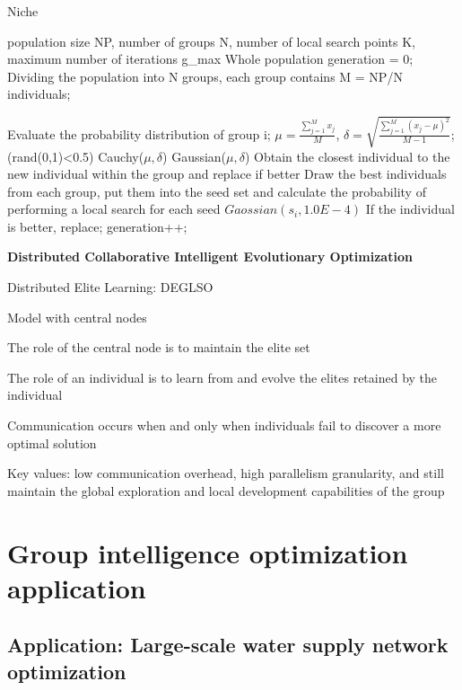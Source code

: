 \documentclass[twocolumn]{article}
\begin{document}
\begin{algorithm}[H]
	\caption{Niche}
	\label{alg:Framwork}
	\begin{algorithmic}[1]
		\Require
		population size NP, number of groups N, number of local search points K, maximum number of iterations g\_max
		\Ensure
		Whole population
		\State
		generation = 0;
		\State
		Dividing the population into N groups, each group contains M = NP/N individuals;
		
		\State
		Evaluate the probability distribution of group i;
		\State $\mu=\frac{\sum_{j=1}^{M}x_j}{M}$,
		$\delta=\sqrt{\frac{\sum_{j=1}^{M}(x_j-\mu)^2}{M-1}}$;
		\State
		\If(rand(0,1)<0.5)
		\State
		Cauchy($\mu,\delta$)
		\Else
		\State
		Gaussian($\mu,\delta$)
		\EndIf
		\State
		Obtain the closest individual to the new individual within the group and replace if better
		\EndFor
		\EndFor
		\State
		Draw the best individuals from each group, put them into the seed set and calculate the probability of performing a local search for each seed
		\State
		$Gaossian(s_i,1.0E-4)$
		If the individual is better, replace;
		\EndFor
		\EndIf
		\EndFor
		\State
		generation++;
		\EndWhile
	\end{algorithmic}
	\label{code}
\end{algorithm}
\textbf{Distributed Collaborative Intelligent Evolutionary Optimization}

Distributed Elite Learning: DEGLSO

Model with central nodes

The role of the central node is to maintain the elite set

The role of an individual is to learn from and evolve the elites
retained by the individual

Communication occurs when and only when individuals fail to discover a
more optimal solution

Key values: low communication overhead, high parallelism granularity,
and still maintain the global exploration and local development
capabilities of the group


\section{ Group intelligence optimization application}

\subsection{Application: Large-scale water supply network optimization}
\end{document}
